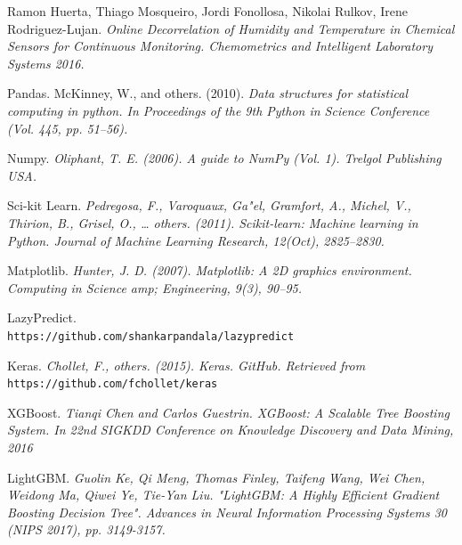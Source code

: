 \documentclass{esannV2}
\begin{document}
\begin{thebibliography}{9}

Ramon Huerta, Thiago Mosqueiro, Jordi Fonollosa, Nikolai Rulkov, Irene Rodriguez-Lujan. 
\textit{Online Decorrelation of Humidity and Temperature in Chemical Sensors for Continuous Monitoring. Chemometrics and Intelligent Laboratory Systems 2016. }


Pandas. McKinney, W., and others. (2010). 
\textit{Data structures for statistical computing in python. In Proceedings of the 9th Python in Science Conference (Vol. 445, pp. 51–56).}

Numpy. \textit{Oliphant, T. E. (2006). A guide to NumPy (Vol. 1). Trelgol Publishing USA.}

Sci-kit Learn. \textit{Pedregosa, F., Varoquaux, Ga"el, Gramfort, A., Michel, V., Thirion, B., Grisel, O., … others. (2011). Scikit-learn: Machine learning in Python. Journal of Machine Learning Research, 12(Oct), 2825–2830.}

Matplotlib. \textit{Hunter, J. D. (2007). Matplotlib: A 2D graphics environment. Computing in Science amp; Engineering, 9(3), 90–95.}

LazyPredict. \\\texttt{https://github.com/shankarpandala/lazypredict}

Keras. \textit{Chollet, F.,  others. (2015). Keras. GitHub. Retrieved from} \\\texttt{https://github.com/fchollet/keras}

XGBoost. \textit{Tianqi Chen and Carlos Guestrin. XGBoost: A Scalable Tree Boosting System. In 22nd SIGKDD Conference on Knowledge Discovery and Data Mining, 2016}

LightGBM.  \textit{Guolin Ke, Qi Meng, Thomas Finley, Taifeng Wang, Wei Chen, Weidong Ma, Qiwei Ye, Tie-Yan Liu. "LightGBM: A Highly Efficient Gradient Boosting Decision Tree". Advances in Neural Information Processing Systems 30 (NIPS 2017), pp. 3149-3157.}

\end{thebibliography}



\end{document}
